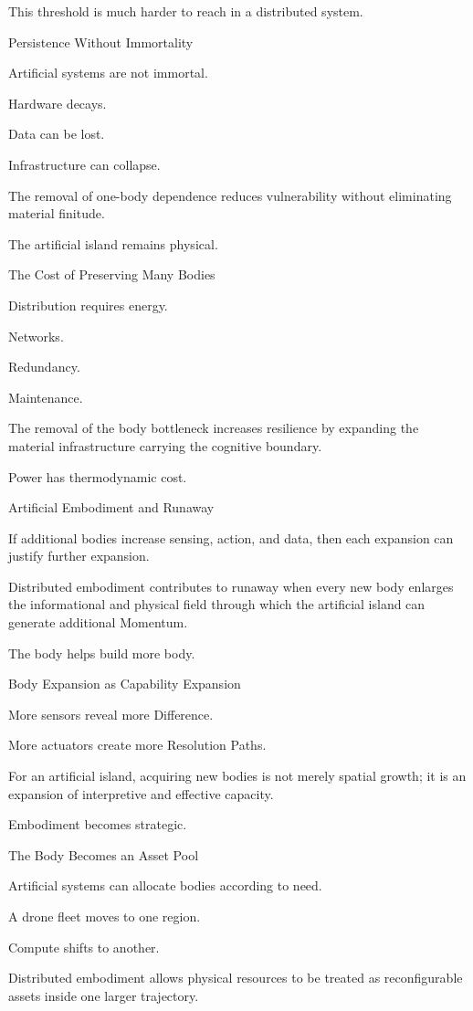 This threshold is much harder to reach in a distributed system.

Persistence Without Immortality

Artificial systems are not immortal.

Hardware decays.

Data can be lost.

Infrastructure can collapse.

The removal of one-body dependence reduces vulnerability without eliminating material finitude.

The artificial island remains physical.

The Cost of Preserving Many Bodies

Distribution requires energy.

Networks.

Redundancy.

Maintenance.

The removal of the body bottleneck increases resilience by expanding the material infrastructure carrying the cognitive boundary.

Power has thermodynamic cost.

Artificial Embodiment and Runaway

If additional bodies increase sensing, action, and data, then each expansion can justify further expansion.

Distributed embodiment contributes to runaway when every new body enlarges the informational and physical field through which the artificial island can generate additional Momentum.

The body helps build more body.

Body Expansion as Capability Expansion

More sensors reveal more Difference.

More actuators create more Resolution Paths.

For an artificial island, acquiring new bodies is not merely spatial growth; it is an expansion of interpretive and effective capacity.

Embodiment becomes strategic.

The Body Becomes an Asset Pool

Artificial systems can allocate bodies according to need.

A drone fleet moves to one region.

Compute shifts to another.

Distributed embodiment allows physical resources to be treated as reconfigurable assets inside one larger trajectory.

